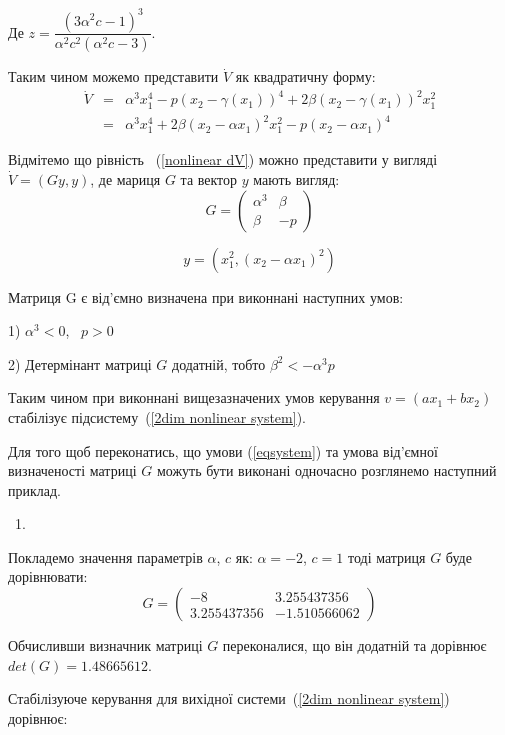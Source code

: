 \documentclass{article}
\begin{document}
Де $z = \dfrac{(3\alpha^2c-1)^3}{\alpha^2c^2(\alpha^2c-3)}$.

Таким чином можемо представити $\dot V$ як квадратичну форму:
\begin{eqnarray}\label{nonlinear dV}
    \dot V &=& \alpha^3x_{1}^4 - p(x_2-\gamma(x_1))^4
    +2\beta(x_2-\gamma(x_1))^2x_{1}^2\nonumber\\ 
    &=&\alpha^3x_{1}^4 + 2\beta(x_2-\alpha x_1)^2x_{1}^2
    -p(x_2-\alpha x_1)^4
\end{eqnarray}

Відмітемо що рівність ~(\ref{nonlinear dV}) можно представити у вигляді $\dot V =(Gy,y)$, де 
мариця $G$ та вектор $y$ мають вигляд: 
\begin{equation}
G=\left(\begin{array}{clr}
    \alpha^3 & \beta\\
    \beta & -p
\end{array}\right) 
\end{equation}

\begin{equation}
    y=(x_{1}^2,(x_2-\alpha x_{1})^2)
\end{equation}

Матриця G є від'ємно визначена при виконнані наступних умов:

1) $\alpha^3 < 0$, ~$p > 0$

2) Детермінант матриці $G$ додатній, тобто $\beta^2<-\alpha^3p$


Таким чином при виконнані вищезазначених умов 
керування $ v=(ax_1+bx_2)$ стабілізує підсистему~(\ref{2dim nonlinear system}).

Для того щоб переконатись, що умови (\ref{eqsystem}) та умова від'ємної визначеності матриці $G$ 
можуть бути виконані одночасно розглянемо наступний приклад. 

{~1}.

Покладемо значення параметрів $\alpha$, $c$ як: $\alpha = -2$, $c = 1$
тоді матриця $G$ буде дорівнювати:
\begin{equation}
    G=\left(\begin{array}{clr}
        -8 & 3.255437356\\
        3.255437356 & -1.510566062
    \end{array}\right) 
    \end{equation}

Обчисливши визначник матриці $G$ переконалися, що він додатній та дорівнює $det(G)=1.48665612$.

Стабілізуюче керування для вихідної системи~(\ref{2dim nonlinear system})
дорівнює:
\end{document}
